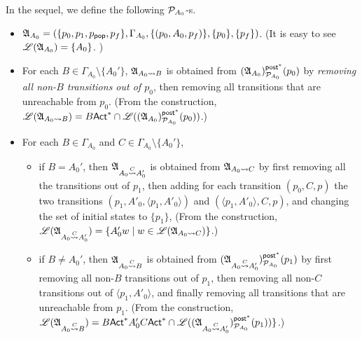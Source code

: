In the sequel, we define the following ${\mathcal{P} }_{A_0}$-{\NFA}s.   
\begin{itemize}
    \item ${\mathfrak{A} }_{A_0} = (\{p_0, p_1, p_{\mathsf{pop}}, p_f\}, \Gamma_{A_0}, \{(p_0,A_0,p_f)\}, \{p_0\}, \{p_f\})$. (It is easy to see ${\mathscr{L} }({\mathfrak{A} }_{A_0}) = \{A_0\}$. )
    \item For each $B \in \Gamma_{A_0} \setminus \{A_0'\}$, ${\mathfrak{A} }_{A_0\rightsquigarrow B}$ is obtained from $({\mathfrak{A} }_{A_0})^{{\mathsf{post} }^*}_{{\mathcal{P} }_{A_0}}(p_0)$ by \emph{removing all non-$B$ transitions out of $p_0$}, then removing all transitions that are unreachable from $p_0$. (From the construction, ${\mathscr{L} }({\mathfrak{A} }_{A_0\rightsquigarrow B}) = B{\sf Act}^* \cap {\mathscr{L} }(({\mathfrak{A} }_{A_0})^{{\mathsf{post} }^*}_{{\mathcal{P} }_{A_0}}(p_0))$.)
    \item For each $B\in\Gamma_{A_0}$ and $C\in\Gamma_{A_0}\setminus\{A_0'\}$, 
    \begin{itemize}
        \item if $B = A_0'$, then ${\mathfrak{A} }_{A_0\stackrel{C}\rightsquigarrow A_0'}$ is obtained from ${\mathfrak{A} }_{A_0 \rightsquigarrow C}$ by first removing all the transitions out of $p_1$, then adding for each transition $(p_0, C, p)$ the two transitions $(p_1, A'_0, \langle p_1, A'_0 \rangle)$ and $(\langle p_1, A'_0 \rangle, C, p)$, and changing the set of initial states to $\{p_1\}$,  (From the construction, ${\mathscr{L} }({\mathfrak{A} }_{A_0\stackrel{C}\rightsquigarrow A'_0})  = \{A'_0 w \mid w \in  {\mathscr{L} }({\mathfrak{A} }_{A_0 \rightsquigarrow C}) \}$.)
        
%
        \item if $B \neq A_0'$, then ${\mathfrak{A} }_{A_0\stackrel{C}\rightsquigarrow B}$ is obtained from $({\mathfrak{A} }_{A_0\stackrel{C}\rightsquigarrow A_0'})^{{\mathsf{post} }^*}_{{\mathcal{P} }_{A_0}}(p_1)$ by first removing all  non-$B$ transitions out of $p_1$, then removing all non-$C$ transitions out of $\langle p_1, A'_0\rangle$, and finally removing all transitions that are unreachable from $p_1$. (From the construction, ${\mathscr{L} }({\mathfrak{A} }_{A_0\stackrel{C}\rightsquigarrow B})  = B{\sf Act}^*A_0'C{\sf Act}^*\cap{\mathscr{L} }(({\mathfrak{A} }_{A_0 \stackrel{C}\rightsquigarrow A_0'})^{{\mathsf{post} }^*}_{{\mathcal{P} }_{A_0}}(p_1)) \}$.)
    \end{itemize}
\end{itemize}
